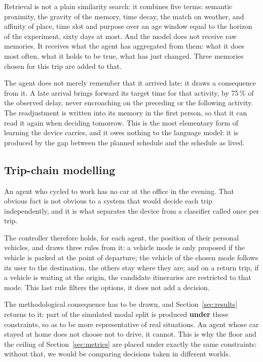 Retrieval is not a plain similarity search: it combines five terms: semantic proximity, the gravity of the memory, time decay, the match on weather, and affinity of place, time slot and purpose over an age window equal to the horizon of the experiment, sixty days at most. And the model does not receive raw memories. It receives what the agent has aggregated from them: what it does most often, what it holds to be true, what has just changed. Three memories chosen for this trip are added to that.


The agent does not merely remember that it arrived late: it draws a consequence from it. A late arrival brings forward its target time for that activity, by 75\,\% of the observed delay, never encroaching on the preceding or the following activity. The readjustment is written into its memory in the first person, so that it can read it again when deciding tomorrow. This is the most elementary form of learning the device carries, and it owes nothing to the language model: it is produced by the gap between the planned schedule and the schedule as lived.

\subsection{Trip-chain modelling}
\label{sec:chain}

An agent who cycled to work has no car at the office in the evening. That obvious fact is not obvious to a system that would decide each trip independently, and it is what separates the device from a classifier called once per trip.

The controller therefore holds, for each agent, the position of their personal vehicles, and draws three rules from it: a vehicle mode is only proposed if the vehicle is parked at the point of departure; the vehicle of the chosen mode follows its user to the destination, the others stay where they are; and on a return trip, if a vehicle is waiting at the origin, the candidate itineraries are restricted to that mode. This last rule filters the options, it does not add a decision.

The methodological consequence has to be drawn, and Section~\ref{sec:results} returns to it: part of the simulated modal split is produced \textbf{under} these constraints, so as to be more representative of real situations. An agent whose car stayed at home does not choose not to drive, it cannot. This is why the floor and the ceiling of Section~\ref{sec:metrics} are placed under exactly the same constraints: without that, we would be comparing decisions taken in different worlds.

